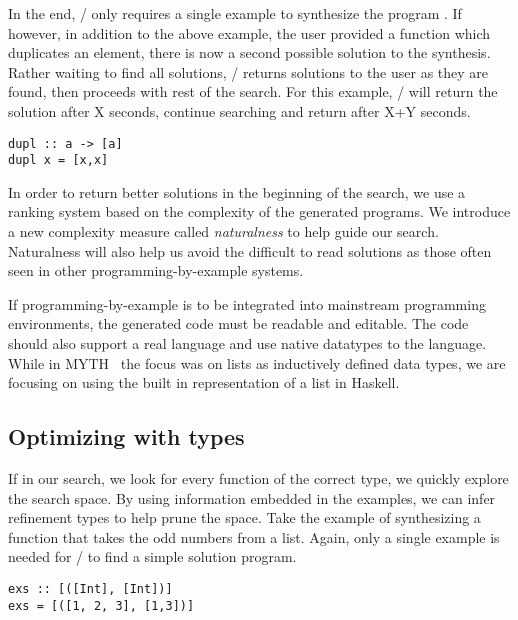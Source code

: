 In the end, \ourTool/ only requires a single example to synthesize the program .
If however, in addition to the above example, the user provided a function  which duplicates an element, there is now a second possible solution to the synthesis.
Rather waiting to find all solutions, \ourTool/ returns solutions to the user as they are found, then proceeds with rest of the search.
For this example, \ourTool/ will return the solution  after X seconds, continue searching and return  after X+Y seconds.

\begin{lstlisting}
dupl :: a -> [a]
dupl x = [x,x]
\end{lstlisting}

In order to return better solutions in the beginning of the search, we use a ranking system based on the complexity of the generated programs.
We introduce a new complexity measure called \textit{naturalness} to help guide our search.
Naturalness will also help us avoid the difficult to read solutions as those often seen in other programming-by-example systems.

If programming-by-example is to be integrated into mainstream programming environments, the generated code must be readable and editable.
The code should also support a real language and use native datatypes to the language.
While in MYTH~\cite{Osera:2015} the focus was on lists as inductively defined data types, we are focusing on using the built in representation of a list in Haskell.

\subsection{Optimizing with types}

If in our search, we look for every function of the correct type, we quickly explore the search space.
By using information embedded in the examples, we can infer refinement types to help prune the space.
Take the example of synthesizing a function that takes the odd numbers from a list.
Again, only a single example is needed for \ourTool/ to find a simple solution program.

\begin{lstlisting}
exs :: [([Int], [Int])]
exs = [([1, 2, 3], [1,3])]
\end{lstlisting}

